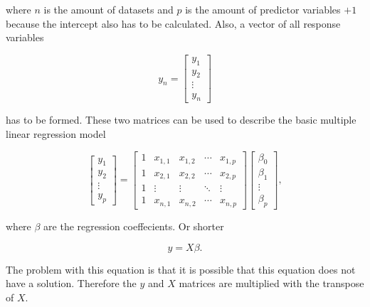 where $ n $ is the amount of datasets and $ p $ is the amount of predictor variables $ + 1 $ because the intercept also has to be calculated. Also, a vector of all response variables

\begin{equation}
    y_{n} =
        \begin{bmatrix}
            y_{1} \\
            y_{2} \\
            \vdots \\
            y_{n}
        \end{bmatrix}
\end{equation}

has to be formed. These two matrices can be used to describe the basic multiple linear regression model

\begin{equation}
    \begin{bmatrix}
        y_{1} \\
        y_{2} \\
        \vdots \\
        y_{p}
    \end{bmatrix}
    =
    \begin{bmatrix}
            1 & x_{1,1} & x_{1,2} & \cdots & x_{1,p} \\
            1 & x_{2,1} & x_{2,2} & \cdots & x_{2,p} \\
            1 & \vdots & \vdots & \ddots & \vdots \\
            1 & x_{n,1} & x_{n,2} & \cdots & x_{n,p}
    \end{bmatrix}
    \begin{bmatrix}
        \beta_{0} \\
        \beta_{1} \\
        \vdots \\
        \beta_{p}
    \end{bmatrix},
\end{equation}

where $ \beta $ are the regression coeffecients. Or shorter

\begin{equation}
    y = X\beta.
\end{equation}


The problem with this equation is that it is possible that this equation does not have a solution. Therefore the $ y $ and $ X $ matrices are multiplied with the transpose of $ X $.

